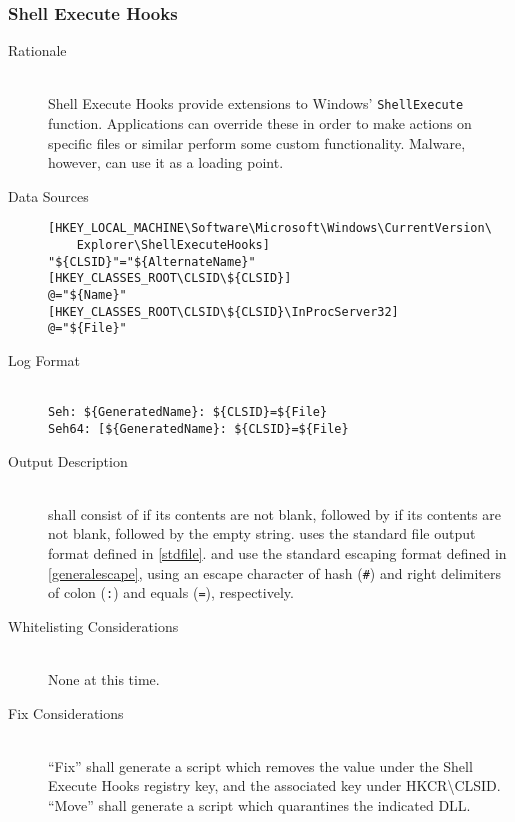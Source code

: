 \subsubsection{Shell Execute Hooks}
\begin{description}
\item[Rationale] \hfill \\
Shell Execute Hooks provide extensions to Windows' \verb|ShellExecute| function.
Applications can override these in order to make actions on specific files or
similar perform some custom functionality. Malware, however, can use it as a
loading point.
\item[Data Sources] \hfill
\vspace{-\baselineskip}
\begin{verbatim}
[HKEY_LOCAL_MACHINE\Software\Microsoft\Windows\CurrentVersion\
    Explorer\ShellExecuteHooks]
"${CLSID}"="${AlternateName}"
[HKEY_CLASSES_ROOT\CLSID\${CLSID}]
@="${Name}"
[HKEY_CLASSES_ROOT\CLSID\${CLSID}\InProcServer32]
@="${File}"
\end{verbatim}
\item[Log Format] \hfill \\
\verb|Seh: ${GeneratedName}: ${CLSID}=${File}| \\
\verb|Seh64: [${GeneratedName}: ${CLSID}=${File}|
\item[Output Description] \hfill \\
 shall consist of  if its
contents are not blank, followed by  if its contents are
not blank, followed by the empty string. \var{File} uses the standard file
output format defined in \ref{stdfile}. \var{GeneratedName} and \var{CLSID} use
the standard escaping format defined in \ref{generalescape}, using an escape
character of hash (\verb|#|) and right delimiters of colon (\verb|:|) and
equals (\verb|=|), respectively.
\item[Whitelisting Considerations] \hfill \\
None at this time.
\item[Fix Considerations] \hfill \\
``Fix'' shall generate a script which removes the value under the
Shell Execute Hooks registry key, and the associated key under
HKCR\textbackslash{}CLSID.
``Move'' shall generate a script which quarantines the indicated DLL.
\end{description}

